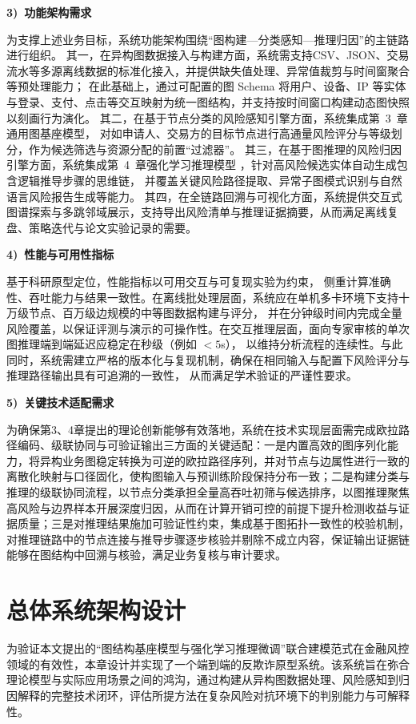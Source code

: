 \textbf{3)\ 功能架构需求}

为支撑上述业务目标，系统功能架构围绕“图构建—分类感知—推理归因”的主链路进行组织。
其一，在{异构图数据接入与构建}方面，系统需支持CSV、JSON、交易流水等多源离线数据的标准化接入，并提供缺失值处理、异常值裁剪与时间窗聚合等预处理能力；
在此基础上，通过可配置的图 Schema 将用户、设备、IP 等实体与登录、支付、点击等交互映射为统一图结构，并支持按时间窗口构建动态图快照以刻画行为演化。
其二，在基于节点分类的风险感知引擎方面，系统集成第~3~章通用图基座模型，
对如申请人、交易方的目标节点进行高通量风险评分与等级划分，作为候选筛选与资源分配的前置“过滤器”。
其三，在基于图推理的风险归因引擎方面，系统集成第~4~章强化学习推理模型
，针对高风险候选实体自动生成包含逻辑推导步骤的思维链，
并覆盖关键风险路径提取、异常子图模式识别与自然语言风险报告生成等能力。
其四，在{全链路回溯与可视化}方面，系统提供交互式图谱探索与多跳邻域展示，支持导出风险清单与推理证据摘要，从而满足离线复盘、策略迭代与论文实验记录的需要。

\textbf{4)\ 性能与可用性指标}

基于科研原型定位，性能指标以可用交互与可复现实验为约束，
侧重计算准确性、吞吐能力与结果一致性。在离线批处理层面，系统应在单机多卡环境下支持十万级节点、百万级边规模的中等图数据构建与评分，
并在分钟级时间内完成全量风险覆盖，以保证评测与演示的可操作性。在交互推理层面，面向专家审核的单次图推理端到端延迟应稳定在秒级（例如 $<5$s），
以维持分析流程的连续性。与此同时，系统需建立严格的版本化与复现机制，确保在相同输入与配置下风险评分与推理路径输出具有可追溯的一致性，
从而满足学术验证的严谨性要求。

\textbf{5)\ 关键技术适配需求}

为确保第3、4章提出的理论创新能够有效落地，系统在技术实现层面需完成欧拉路径编码、级联协同与可验证输出三方面的关键适配：一是内置高效的图序列化能力，将异构业务图稳定转换为可逆的欧拉路径序列，并对节点与边属性进行一致的离散化映射与口径固化，使构图输入与预训练阶段保持分布一致；二是构建分类与推理的级联协同流程，以节点分类承担全量高吞吐初筛与候选排序，以图推理聚焦高风险与边界样本开展深度归因，从而在计算开销可控的前提下提升检测收益与证据质量；三是对推理结果施加可验证性约束，集成基于图拓扑一致性的校验机制，对推理链路中的节点连接与推导步骤逐步核验并剔除不成立内容，保证输出证据链能够在图结构中回溯与核验，满足业务复核与审计要求。


\section{总体系统架构设计}

为验证本文提出的“图结构基座模型与强化学习推理微调”联合建模范式在金融风控领域的有效性，本章设计并实现了一个端到端的反欺诈原型系统。该系统旨在弥合理论模型与实际应用场景之间的鸿沟，通过构建从异构图数据处理、风险感知到归因解释的完整技术闭环，评估所提方法在复杂风险对抗环境下的判别能力与可解释性。


